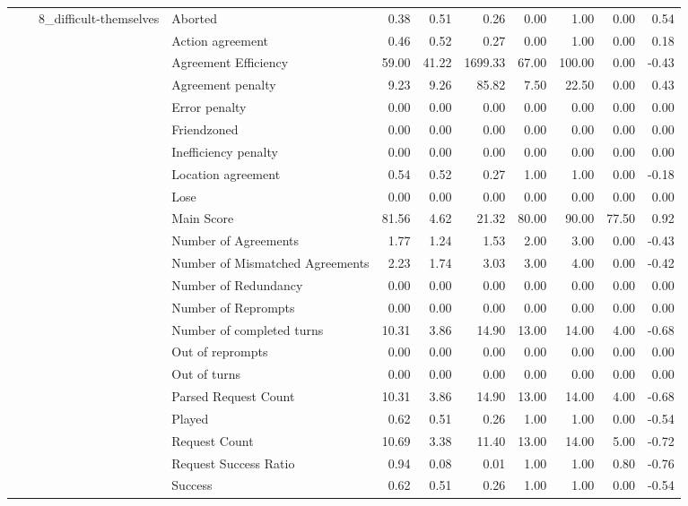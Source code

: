 \begin{tabular}{llllrrrrrrr}
\cline{3-11}
 &  & \multirow[t]{27}{*}{8_difficult-themselves} & Aborted & 0.38 & 0.51 & 0.26 & 0.00 & 1.00 & 0.00 & 0.54 \\
 &  &  & Action agreement & 0.46 & 0.52 & 0.27 & 0.00 & 1.00 & 0.00 & 0.18 \\
 &  &  & Agreement Efficiency & 59.00 & 41.22 & 1699.33 & 67.00 & 100.00 & 0.00 & -0.43 \\
 &  &  & Agreement penalty & 9.23 & 9.26 & 85.82 & 7.50 & 22.50 & 0.00 & 0.43 \\
 &  &  & Error penalty & 0.00 & 0.00 & 0.00 & 0.00 & 0.00 & 0.00 & 0.00 \\
 &  &  & Friendzoned & 0.00 & 0.00 & 0.00 & 0.00 & 0.00 & 0.00 & 0.00 \\
 &  &  & Inefficiency penalty & 0.00 & 0.00 & 0.00 & 0.00 & 0.00 & 0.00 & 0.00 \\
 &  &  & Location agreement & 0.54 & 0.52 & 0.27 & 1.00 & 1.00 & 0.00 & -0.18 \\
 &  &  & Lose & 0.00 & 0.00 & 0.00 & 0.00 & 0.00 & 0.00 & 0.00 \\
 &  &  & Main Score & 81.56 & 4.62 & 21.32 & 80.00 & 90.00 & 77.50 & 0.92 \\
 &  &  & Number of Agreements & 1.77 & 1.24 & 1.53 & 2.00 & 3.00 & 0.00 & -0.43 \\
 &  &  & Number of Mismatched Agreements & 2.23 & 1.74 & 3.03 & 3.00 & 4.00 & 0.00 & -0.42 \\
 &  &  & Number of Redundancy & 0.00 & 0.00 & 0.00 & 0.00 & 0.00 & 0.00 & 0.00 \\
 &  &  & Number of Reprompts & 0.00 & 0.00 & 0.00 & 0.00 & 0.00 & 0.00 & 0.00 \\
 &  &  & Number of completed turns & 10.31 & 3.86 & 14.90 & 13.00 & 14.00 & 4.00 & -0.68 \\
 &  &  & Out of reprompts & 0.00 & 0.00 & 0.00 & 0.00 & 0.00 & 0.00 & 0.00 \\
 &  &  & Out of turns & 0.00 & 0.00 & 0.00 & 0.00 & 0.00 & 0.00 & 0.00 \\
 &  &  & Parsed Request Count & 10.31 & 3.86 & 14.90 & 13.00 & 14.00 & 4.00 & -0.68 \\
 &  &  & Played & 0.62 & 0.51 & 0.26 & 1.00 & 1.00 & 0.00 & -0.54 \\
 &  &  & Request Count & 10.69 & 3.38 & 11.40 & 13.00 & 14.00 & 5.00 & -0.72 \\
 &  &  & Request Success Ratio & 0.94 & 0.08 & 0.01 & 1.00 & 1.00 & 0.80 & -0.76 \\
 &  &  & Success & 0.62 & 0.51 & 0.26 & 1.00 & 1.00 & 0.00 & -0.54 \\

\end{tabular}
